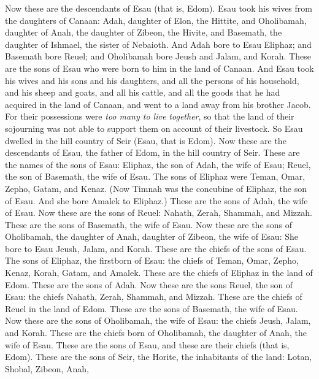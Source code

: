 \begin{biblechapter} %
 Now these are the descendants of Esau (that is, Edom).
\verse Esau took his wives from the daughters of Canaan: Adah, daughter of Elon, the Hittite, and Oholibamah, daughter of Anah, the daughter of Zibeon, the Hivite,
\verse and Basemath, the daughter of Ishmael, the sister of Nebaioth.
\verse And Adah bore to Esau Eliphaz; and Basemath bore Reuel;
\verse and Oholibamah bore Jeush and Jalam, and Korah. These are the sons of Esau who were born to him in the land of Canaan.
\verse And Esau took his wives and his sons and his daughters, and all the persons of his household, and his sheep and goats, and all his cattle, and all the goods that he had acquired in the land of Canaan, and went to a land away from his brother Jacob.
\verse For their possessions were \textit{too many to live together}, so that the land of their sojourning was not able to support them on account of their livestock.
\verse So Esau dwelled in the hill country of Seir (Esau, that is Edom).
\verse Now these are the descendants of Esau, the father of Edom, in the hill country of Seir.
\verse These are the names of the sons of Esau: Eliphaz, the son of Adah, the wife of Esau; Reuel, the son of Basemath, the wife of Esau.
\verse The sons of Eliphaz were Teman, Omar, Zepho, Gatam, and Kenaz.
\verse (Now Timnah was the concubine of Eliphaz, the son of Esau. And she bore Amalek to Eliphaz.) These are the sons of Adah, the wife of Esau.
\verse Now these are the sons of Reuel: Nahath, Zerah, Shammah, and Mizzah. These are the sons of Basemath, the wife of Esau.
\verse Now these are the sons of Oholibamah, the daughter of Anah, daughter of Zibeon, the wife of Esau: She bore to Esau Jeush, Jalam, and Korah.
\verse These are the chiefs of the sons of Esau. The sons of Eliphaz, the firstborn of Esau: the chiefs of Teman, Omar, Zepho, Kenaz,
\verse Korah, Gatam, and Amalek. These are the chiefs of Eliphaz in the land of Edom. These are the sons of Adah.
\verse Now these are the sons Reuel, the son of Esau: the chiefs Nahath, Zerah, Shammah, and Mizzah. These are the chiefs of Reuel in the land of Edom. These are the sons of Basemath, the wife of Esau.
\verse Now these are the sons of Oholibamah, the wife of Esau: the chiefs Jeush, Jalam, and Korah. These are the chiefs born of Oholibamah, the daughter of Anah, the wife of Esau.
\verse These are the sons of Esau, and these are their chiefs (that is, Edom).
\verse These are the sons of Seir, the Horite, the inhabitants of the land: Lotan, Shobal, Zibeon, Anah,

\end{biblechapter}
